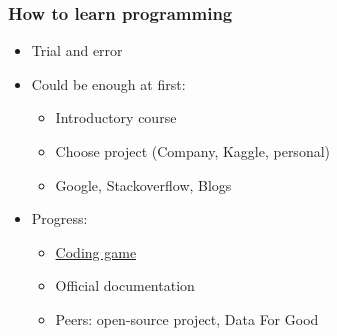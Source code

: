 \begin{frame}\frametitle{How to learn programming}
   \begin{itemize}
      \item Trial and error
      \item Could be enough at first:
      \begin{itemize}
         \item Introductory course
         \item Choose project (Company, Kaggle, personal)
         \item Google, Stackoverflow, Blogs
      \end{itemize}

      \item Progress:
      \begin{itemize}
         \item \href{https://www.codingame.com/home}{Coding game}
         \item Official documentation
         \item Peers: open-source project, Data For Good
      \end{itemize}
   \end{itemize}
\end{frame}


